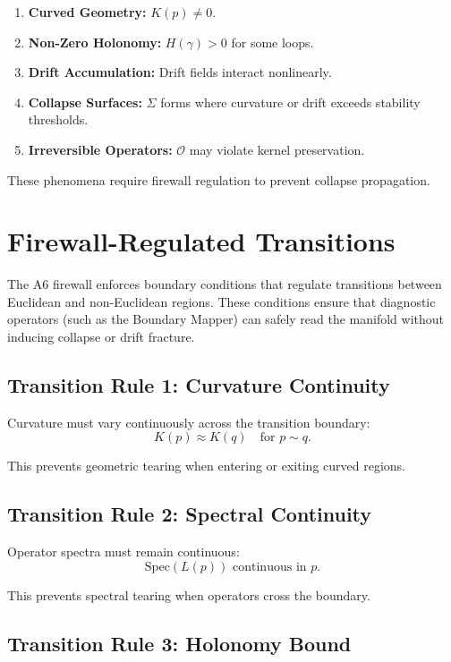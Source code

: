 \begin{enumerate}
    \item \textbf{Curved Geometry:} $K(p) \neq 0$.
    \item \textbf{Non-Zero Holonomy:} $H(\gamma) > 0$ for some loops.
    \item \textbf{Drift Accumulation:} Drift fields interact nonlinearly.
    \item \textbf{Collapse Surfaces:} $\Sigma$ forms where curvature or drift
          exceeds stability thresholds.
    \item \textbf{Irreversible Operators:} $\mathcal{O}$ may violate kernel
          preservation.
\end{enumerate}

These phenomena require firewall regulation to prevent collapse propagation.

\section{Firewall-Regulated Transitions}

The A6 firewall enforces boundary conditions that regulate transitions between
Euclidean and non-Euclidean regions. These conditions ensure that diagnostic
operators (such as the Boundary Mapper) can safely read the manifold without
inducing collapse or drift fracture.

\subsection{Transition Rule 1: Curvature Continuity}

Curvature must vary continuously across the transition boundary:
\[
K(p) \approx K(q) \quad \text{for } p \sim q.
\]

This prevents geometric tearing when entering or exiting curved regions.

\subsection{Transition Rule 2: Spectral Continuity}

Operator spectra must remain continuous:
\[
\mathrm{Spec}(L(p)) \text{ continuous in } p.
\]

This prevents spectral tearing when operators cross the boundary.

\subsection{Transition Rule 3: Holonomy Bound}

